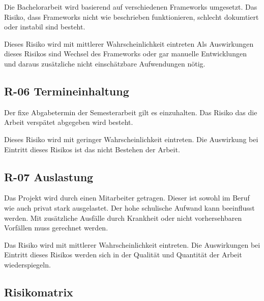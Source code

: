 Die Bachelorarbeit wird basierend auf verschiedenen Frameworks
umgesetzt. Das Risiko, dass Frameworks nicht wie beschrieben
funktionieren, schlecht dokumtiert oder instabil sind besteht.

Dieses Risiko wird mit mittlerer Wahrscheinlichkeit eintreten Als
Auswirkungen dieses Risikos sind Wechsel des Frameworks oder gar
manuelle Entwicklungen und daraus zusätzliche nicht einschätzbare
Aufwendungen nötig.

\subsection{R-06 Termineinhaltung}\label{r-06-termineinhaltung}

Der fixe Abgabetermin der Semesterarbeit gilt es einzuhalten. Das Risiko
das die Arbeit verspätet abgegeben wird besteht.

Dieses Risiko wird mit geringer Wahrscheinlichkeit eintreten. Die
Auswirkung bei Eintritt dieses Risikos ist das nicht Bestehen der
Arbeit.

\subsection{R-07 Auslastung}\label{r-07-auslastung}

Das Projekt wird durch einen Mitarbeiter getragen. Dieser ist sowohl im
Beruf wie auch privat stark ausgelastet. Der hohe schulische Aufwand
kann beeinflusst werden. Mit zusätzliche Ausfälle durch Krankheit oder
nicht vorhersehbaren Vorfällen muss gerechnet werden.

Das Risiko wird mit mittlerer Wahrscheinlichkeit eintreten. Die
Auswirkungen bei Eintritt dieses Risikos werden sich in der Qualität und
Quantität der Arbeit wiederspiegeln.

\newpage

\subsection{Risikomatrix}\label{risikomatrix}

